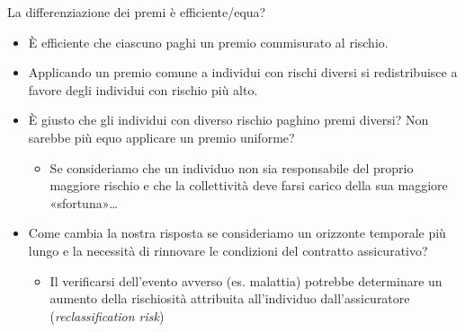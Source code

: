 \documentclass[aspectratio=64,12pt]{beamer}
\begin{document}
\begin{frame}{La differenziazione dei premi è efficiente/equa?}
\begin{itemize}
\item È efficiente che ciascuno paghi un premio commisurato al rischio.
\item Applicando un premio comune a individui con rischi diversi si
  redistribuisce a favore degli individui con rischio più alto.
\item È giusto che gli individui con diverso rischio paghino premi diversi?
  Non sarebbe più equo applicare un premio uniforme?
\begin{itemize}
\item Se consideriamo che un individuo non sia responsabile del proprio
  maggiore rischio e che la collettività deve farsi carico della sua maggiore
  «sfortuna»\ldots{}
\end{itemize}
\item Come cambia la nostra risposta se consideriamo un orizzonte temporale
  più lungo e la necessità di rinnovare le condizioni del contratto
  assicurativo?
\begin{itemize}
\item Il verificarsi dell'evento avverso (es. malattia) potrebbe
determinare un aumento della rischiosità attribuita all'individuo
dall'assicuratore (\emph{reclassification risk})
\end{itemize}
\end{itemize}
\end{frame}
\end{document}
